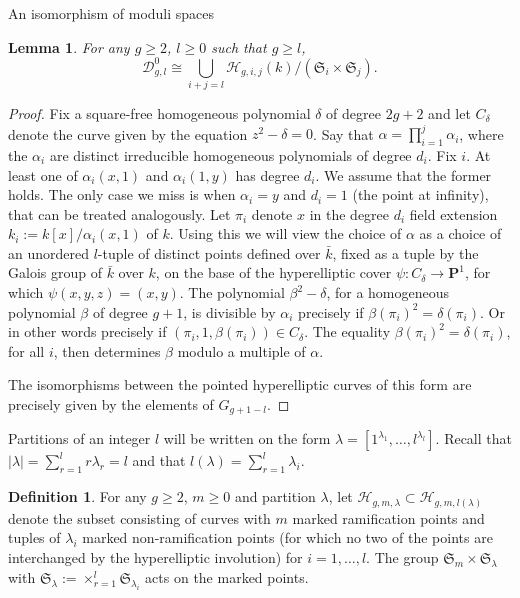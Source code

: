 \documentclass[10pt,a4paper,twoside]{amsart}
\theoremstyle{plain}
\newtheorem{lem}[theo]{Lemma}
\theoremstyle{definition}
\newtheorem{defin}{Definition}
\theoremstyle{remark}
\begin{document}
\begin{subsection}{An isomorphism of moduli spaces}
\begin{lem} For any $g \geq 2$, $l \geq 0$ such that $g \geq l$,  
\begin{equation}\label{eq1}
    \mathcal{D}^0_{g,l} \cong \bigcup_{i+j=l} \mathcal H_{g,i,j}(k)/(\mathfrak S_i \times \mathfrak S_j).
\end{equation}
\end{lem}

\begin{proof}
Fix a square-free homogeneous polynomial $\delta$ of degree $2g+2$ and let $C_{\delta}$ denote the curve given by the equation $z^2-\delta=0$. Say that $\alpha=\prod_{i=1}^j \alpha_i$, where the $\alpha_i$ are distinct irreducible homogeneous polynomials of degree $d_i$. Fix $i$. At least one of $\alpha_i(x,1)$ and $\alpha_i(1,y)$ has degree $d_i$. We assume that the former holds. The only case we miss is when $\alpha_i=y$ and $d_i=1$ (the point at infinity), that can be treated analogously. Let $\pi_i$ denote $x$ in the degree $d_i$ field extension $k_i:=k[x]/\alpha_i(x,1)$ of $k$. Using this we will view the choice of $\alpha$ as a choice of an unordered $l$-tuple of distinct points defined over $\bar k$, fixed as a tuple by the Galois group of $\bar k$ over $k$, on the base of the hyperelliptic cover $\psi: C_{\delta} \to \mathbf P^1$, for which $\psi(x,y,z)=(x,y)$. 
The polynomial $\beta^2-\delta$, for a homogeneous polynomial $\beta$ of degree $g+1$, is divisible by $\alpha_i$ precisely if $\beta(\pi_i)^2=\delta(\pi_i)$. Or in other words precisely if $(\pi_i,1,\beta(\pi_i)) \in C_{\delta}$. The equality $\beta(\pi_i)^2=\delta(\pi_i)$, for all $i$, then determines $\beta$ modulo a multiple of $\alpha$. 

The isomorphisms between the pointed hyperelliptic curves of this form are precisely given by the elements of $G_{g+1-l}$. 
\end{proof}

Partitions of an integer $l$ will be written on the form $\lambda=[1^{\lambda_1},\ldots,l^{\lambda_l}]$. Recall that $|\lambda|=\sum_{r=1}^l r\lambda_r=l$ and that $l(\lambda)=\sum_{r=1}^l \lambda_i$. 

\begin{defin}\label{def-3} For any $g \geq 2$, $m \geq 0$ and partition $\lambda$, let $\mathcal H_{g,m,\lambda} \subset \mathcal H_{g,m,l(\lambda)}$ denote the subset consisting of curves with $m$ marked ramification points and tuples of $\lambda_i$ marked non-ramification points (for which no two of the points are interchanged by the hyperelliptic involution) for $i=1,\ldots,l$. The group $\mathfrak S_m \times \mathfrak S_{\lambda}$ with $\mathfrak S_{\lambda}:=\times_{r=1}^l \mathfrak S_{\lambda_i}$ acts on the marked points. 
 

\end{defin}
\end{subsection}
\end{document}
